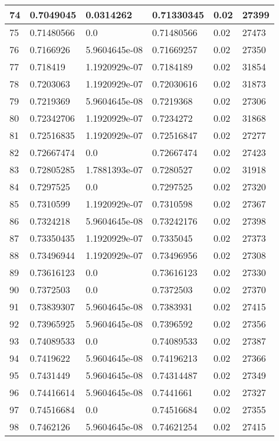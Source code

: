 \begin{longtable}{|l|l|l|l|l|l|}
74 & 0.7049045 & 0.0314262 & 0.71330345 & 0.02 & 27399 \\ \hline 
75 & 0.71480566 & 0.0 & 0.71480566 & 0.02 & 27473 \\ \hline 
76 & 0.7166926 & 5.9604645e-08 & 0.71669257 & 0.02 & 27350 \\ \hline 
77 & 0.718419 & 1.1920929e-07 & 0.7184189 & 0.02 & 31854 \\ \hline 
78 & 0.7203063 & 1.1920929e-07 & 0.72030616 & 0.02 & 31873 \\ \hline 
79 & 0.7219369 & 5.9604645e-08 & 0.7219368 & 0.02 & 27306 \\ \hline 
80 & 0.72342706 & 1.1920929e-07 & 0.7234272 & 0.02 & 31868 \\ \hline 
81 & 0.72516835 & 1.1920929e-07 & 0.72516847 & 0.02 & 27277 \\ \hline 
82 & 0.72667474 & 0.0 & 0.72667474 & 0.02 & 27423 \\ \hline 
83 & 0.72805285 & 1.7881393e-07 & 0.7280527 & 0.02 & 31918 \\ \hline 
84 & 0.7297525 & 0.0 & 0.7297525 & 0.02 & 27320 \\ \hline 
85 & 0.7310599 & 1.1920929e-07 & 0.7310598 & 0.02 & 27367 \\ \hline 
86 & 0.7324218 & 5.9604645e-08 & 0.73242176 & 0.02 & 27398 \\ \hline 
87 & 0.73350435 & 1.1920929e-07 & 0.7335045 & 0.02 & 27373 \\ \hline 
88 & 0.73496944 & 1.1920929e-07 & 0.73496956 & 0.02 & 27308 \\ \hline 
89 & 0.73616123 & 0.0 & 0.73616123 & 0.02 & 27330 \\ \hline 
90 & 0.7372503 & 0.0 & 0.7372503 & 0.02 & 27370 \\ \hline 
91 & 0.73839307 & 5.9604645e-08 & 0.7383931 & 0.02 & 27415 \\ \hline 
92 & 0.73965925 & 5.9604645e-08 & 0.7396592 & 0.02 & 27356 \\ \hline 
93 & 0.74089533 & 0.0 & 0.74089533 & 0.02 & 27387 \\ \hline 
94 & 0.7419622 & 5.9604645e-08 & 0.74196213 & 0.02 & 27366 \\ \hline 
95 & 0.7431449 & 5.9604645e-08 & 0.74314487 & 0.02 & 27349 \\ \hline 
96 & 0.74416614 & 5.9604645e-08 & 0.7441661 & 0.02 & 27327 \\ \hline 
97 & 0.74516684 & 0.0 & 0.74516684 & 0.02 & 27355 \\ \hline 
98 & 0.7462126 & 5.9604645e-08 & 0.74621254 & 0.02 & 27415 \\ \hline 

\end{longtable}
